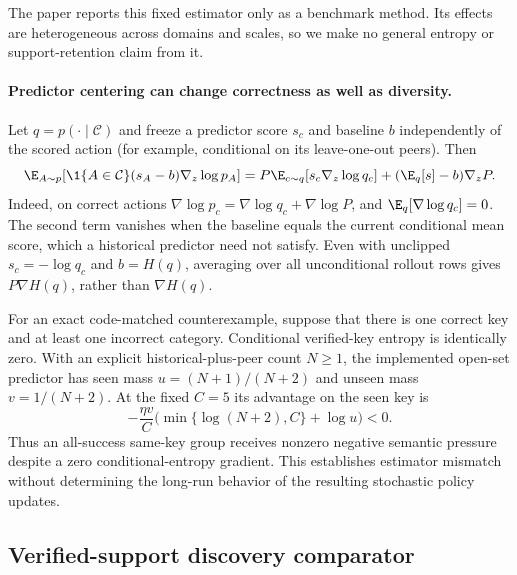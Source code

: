 The paper reports this fixed estimator only as a benchmark method. Its effects are
heterogeneous across domains and scales, so we make no general entropy or
support-retention claim from it.

\paragraph{Predictor centering can change correctness as well as diversity.}
Let $q=p(\cdot\mid\mathcal C)$ and freeze a predictor score $s_c$ and baseline
$b$ independently of the scored action (for example, conditional on its
leave-one-out peers). Then
\[
 \E_{A\sim p}\!\left[\1\{A\in\mathcal C\}(s_A-b)
                  \nabla_z\log p_A\right]
 =P\E_{c\sim q}[s_c\nabla_z\log q_c]
  +(\E_q[s]-b)\nabla_zP.
\]
Indeed, on correct actions
$\nabla\log p_c=\nabla\log q_c+\nabla\log P$, and
$\E_q[\nabla\log q_c]=0$.
The second term vanishes when the baseline equals the current conditional
mean score, which a historical predictor need not satisfy. Even with
unclipped $s_c=-\log q_c$ and $b=H(q)$, averaging over all unconditional
rollout rows gives $P\nabla H(q)$, rather than $\nabla H(q)$.

For an exact code-matched counterexample, suppose that there is one correct
key and at least one incorrect category. Conditional verified-key entropy is
identically zero. With an explicit historical-plus-peer count $N\ge1$, the
implemented open-set predictor has seen mass $u=(N+1)/(N+2)$ and unseen mass
$v=1/(N+2)$. At the fixed $C=5$ its advantage on the seen key is
\[
 -\frac{\eta v}{C}\bigl(\min\{\log(N+2),C\}+\log u\bigr)<0.
\]
Thus an all-success same-key group receives nonzero negative semantic
pressure despite a zero conditional-entropy gradient. This establishes
estimator mismatch without determining the long-run behavior of the resulting
stochastic policy updates.

\subsection{Verified-support discovery comparator}
\label{app:verified-support-semantic-estimator}

